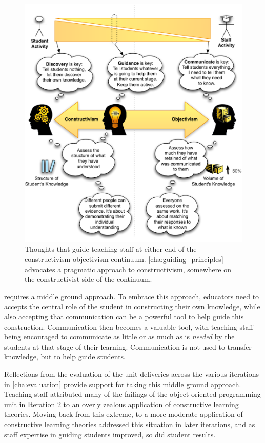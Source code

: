 \begin{figure}[tbp]
	\centering
	\includegraphics[width=\textwidth]{BalanceConstructivism}
	\caption{Thoughts that guide teaching staff at either end of the constructivism-objectivism continuum. \cref{cha:guiding_principles} advocates a pragmatic approach to constructivism, somewhere on the constructivist side of the continuum. }
	\label{fig:balanced_constructivism}
\end{figure}

 requires a middle ground approach. To embrace this approach, educators need to accepts the central role of the student in constructing their own knowledge, while also accepting that communication can be a powerful tool to help guide this construction. Communication then becomes a valuable tool, with teaching staff being encouraged to communicate as little or as much as is \emph{needed} by the students at that stage of their learning. Communication is not used to transfer knowledge, but to help guide students.

Reflections from the evaluation of the unit deliveries across the various iterations in \cref{cha:evaluation} provide support for taking this middle ground approach. Teaching staff attributed many of the failings of the object oriented programming unit in Iteration 2 to an overly zealous application of constructive learning theories. Moving back from this extreme, to a more moderate application of constructive learning theories addressed this situation in later iterations, and as staff expertise in guiding students improved, so did student results.

